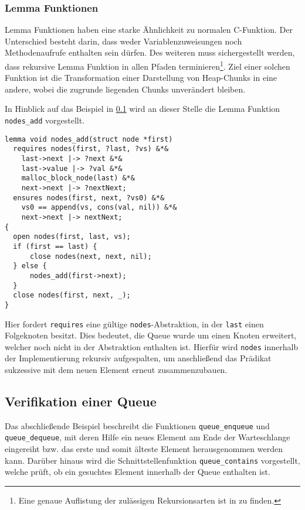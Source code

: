 \subsubsection{Lemma Funktionen}
\label{subsubsec:lemma}

Lemma Funktionen haben eine starke Ähnlichkeit zu normalen C-Funktion. Der Unterschied besteht darin, dass weder Variablenzuweisungen noch Methodenaufrufe enthalten sein dürfen. Des weiteren muss sichergestellt werden, dass rekursive Lemma Funktion in allen Pfaden terminieren\footnote{Eine genaue Auflistung der zulässigen Rekursionsarten ist in \cite[S. 22]{Jacobs2017} zu finden.}. Ziel einer solchen Funktion ist die Transformation einer Darstellung von Heap-Chunks in eine andere, wobei die zugrunde liegenden Chunks unverändert bleiben. \cite{Jacobs2010}

In Hinblick auf das Beispiel in \cref{subsec:queue} wird an dieser Stelle die Lemma Funktion \texttt{nodes\_add} vorgestellt.

\begin{lstlisting}
lemma void nodes_add(struct node *first)
  requires nodes(first, ?last, ?vs) &*&
    last->next |-> ?next &*&
    last->value |-> ?val &*&
    malloc_block_node(last) &*&
    next->next |-> ?nextNext;
  ensures nodes(first, next, ?vs0) &*&
    vs0 == append(vs, cons(val, nil)) &*&
    next->next |-> nextNext;
{
  open nodes(first, last, vs);
  if (first == last) {
      close nodes(next, next, nil);
  } else {
      nodes_add(first->next);
  }
  close nodes(first, next, _);
}
\end{lstlisting}

\noindent
Hier fordert \texttt{requires} eine gültige \texttt{nodes}-Abstraktion, in der \texttt{last} einen Folgeknoten besitzt. Dies bedeutet, die Queue wurde um einen Knoten erweitert, welcher noch nicht in der Abstraktion enthalten ist. Hierfür wird \texttt{nodes} innerhalb der Implementierung rekursiv aufgespalten, um anschließend das Prädikat sukzessive mit dem neuen Element erneut zusammenzubauen.

\subsection{Verifikation einer Queue}
\label{subsec:queue}

Das abschließende Beispiel beschreibt die Funktionen \texttt{queue\_enqueue} und \texttt{queue\_dequeue}, mit deren Hilfe ein neues Element am Ende der Warteschlange eingereiht bzw. das erste und somit älteste Element herausgenommen werden kann. Darüber hinaus wird die Schnittstellenfunktion \texttt{queue\_contains} vorgestellt, welche prüft, ob ein gesuchtes Element innerhalb der Queue enthalten ist.

